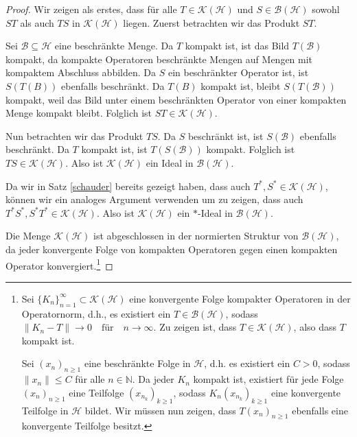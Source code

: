 \documentclass[11pt, hidelinks]{article}
\numberwithin{conj}{section}
\begin{document}
\begin{proof}
Wir zeigen als erstes, dass für alle $T \in \mathcal{K}(\mathcal{H})$ und $S \in \mathcal{B}(\mathcal{H})$ sowohl $ST$ als auch $TS$ in $\mathcal{K}(\mathcal{H})$ liegen. Zuerst betrachten wir das Produkt $ST$.

Sei $\mathcal{B} \subseteq \mathcal{H}$ eine beschränkte Menge. Da $T$ kompakt ist, ist das Bild $T(\mathcal{B})$ kompakt, da kompakte Operatoren beschränkte Mengen auf Mengen mit kompaktem Abschluss abbilden. Da $S$ ein beschränkter Operator ist, ist $S(T(B))$ ebenfalls beschränkt. Da $T(B)$ kompakt ist, bleibt $S(T(\mathcal{B}))$ kompakt, weil das Bild unter einem beschränkten Operator von einer kompakten Menge kompakt bleibt. Folglich ist $ST \in \mathcal{K}(\mathcal{H})$.

Nun betrachten wir das Produkt $TS$. Da $S$ beschränkt ist, ist $S(\mathcal{B})$ ebenfalls beschränkt. Da $T$ kompakt ist, ist $T(S(\mathcal{B}))$ kompakt. Folglich ist $TS \in \mathcal{K}(\mathcal{H})$. Also ist $\mathcal{K}(\mathcal{H})$ ein Ideal in $\mathcal{B}(\mathcal{H})$.

Da wir in Satz \ref{schauder} bereits gezeigt haben, dass auch $T^\ast, S^\ast \in \mathcal{K}(\mathcal{H})$, können wir ein analoges Argument verwenden um zu zeigen, dass auch $T^\ast S^\ast, S^\ast T^\ast \in \mathcal{K}(\mathcal{H})$. Also ist $\mathcal{K}(\mathcal{H})$ ein $\ast$-Ideal in $\mathcal{B}(\mathcal{H})$.

Die Menge $\mathcal{K}(\mathcal{H})$ ist abgeschlossen in der normierten Struktur von $\mathcal{B}(\mathcal{H})$, da jeder konvergente Folge von kompakten Operatoren gegen einen kompakten Operator konvergiert.\footnote{Sei \(\{K_n\}_{n=1}^{\infty} \subset \mathcal{K}(\mathcal{H})\) eine konvergente Folge kompakter Operatoren in der Operatornorm, d.h., es existiert ein \(T \in \mathcal{B}(\mathcal{H})\), sodass $\|K_n - T\| \to 0 \quad \text{für} \quad n \to \infty$. Zu zeigen ist, dass \(T \in \mathcal{K}(\mathcal{H})\), also dass \(T\) kompakt ist.

Sei \((x_n)_{n\geq 1}\) eine beschränkte Folge in \(\mathcal{H}\), d.h. es existiert ein \(C > 0\), sodass \(\|x_n\| \leq C\) für alle \(n \in \mathbb{N}\). Da jeder \(K_n\) kompakt ist, existiert für jede Folge \((x_n)_{n\geq 1}\) eine Teilfolge \((x_{n_k})_{k\geq 1}\), sodass \(K_n(x_{n_k})_{k\geq 1}\) eine konvergente Teilfolge in \(\mathcal{H}\) bildet. Wir müssen nun zeigen, dass \(T(x_n)_{n\geq 1}\) ebenfalls eine konvergente Teilfolge besitzt.

}
\end{proof}
\end{document}
